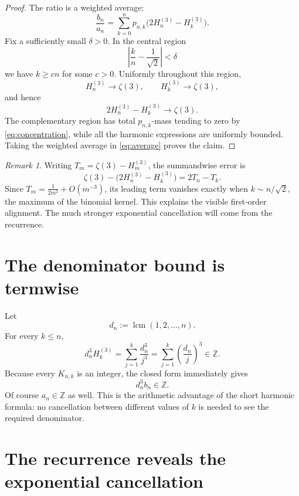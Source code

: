 \documentclass[11pt]{article}
\theoremstyle{remark}
\newtheorem*{remark}{Remark}
\newcommand{\HH}[2]{H_{#1}^{(#2)}}
\newcommand{\zetaThree}{\zeta(3)}
\newcommand{\lcm}{\operatorname{lcm}}
\begin{document}
\begin{proof}
The ratio is a weighted average:
\begin{equation}\label{eq:average}
 \frac{b_n}{a_n}
 =
 \sum_{k=0}^np_{n,k}
 \bigl(2\HH n3-\HH k3\bigr).
\end{equation}
Fix a sufficiently small \(\delta>0\).  In the central region
\[
 \left|\frac{k}{n}-\frac1{\sqrt2}\right|<\delta
\]
we have \(k\geq cn\) for some \(c>0\).  Uniformly throughout this region,
\[
 \HH n3\longrightarrow\zetaThree,
 \qquad
 \HH k3\longrightarrow\zetaThree,
\]
and hence
\[
 2\HH n3-\HH k3\longrightarrow\zetaThree.
\]
The complementary region has total \(p_{n,k}\)-mass tending to zero by
\eqref{eq:concentration}, while all the harmonic expressions are uniformly
bounded.  Taking the weighted average in \eqref{eq:average} proves the claim.
\end{proof}

\begin{remark}
Writing \(T_m=\zetaThree-\HH m3\), the summandwise error is
\[
 \zetaThree-\bigl(2\HH n3-\HH k3\bigr)=2T_n-T_k.
\]
Since \(T_m=\frac1{2m^2}+O(m^{-3})\), its leading term vanishes exactly when
\(k\sim n/\sqrt2\), the maximum of the binomial kernel.  This explains the
visible first-order alignment.  The much stronger exponential cancellation
will come from the recurrence.
\end{remark}

\section{The denominator bound is termwise}

Let
\[
 d_n:=\lcm(1,2,\ldots,n).
\]
For every \(k\leq n\),
\[
 d_n^3\HH k3
 =
 \sum_{j=1}^k\frac{d_n^3}{j^3}
 =
 \sum_{j=1}^k\left(\frac{d_n}{j}\right)^3
 \in\mathbb Z.
\]
Because every \(K_{n,k}\) is an integer, the closed form immediately gives
\begin{equation}\label{eq:denominator}
 \boxed{d_n^3b_n\in\mathbb Z.}
\end{equation}
Of course \(a_n\in\mathbb Z\) as well.  This is the arithmetic advantage of
the short harmonic formula: no cancellation between different values of
\(k\) is needed to see the required denominator.

\section{The recurrence reveals the exponential cancellation}
\end{document}
